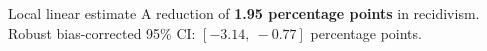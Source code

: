 \begin{block}{Local linear estimate}
A reduction of \textbf{1.95 percentage points} in recidivism.\\[0.6em]
Robust bias-corrected 95\% CI: $[-3.14,\ -0.77]$ percentage points.
\end{block}
